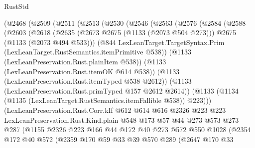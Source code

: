 \begin{lexlean}{RustStd}
\begin{coremodule}
    (@2468
      (@2509
        (@2511
          (@2513
            (@2530
              (@2546
                (@2563
                  (@2576
                    (@2584
                      (@2588
                        (@2603
                          (@2618
                            (@2635
                              (@2673 @2675 (@1133 (@2073 @504 @273)))
                              @2675
                              (@1133 (@2073 @494 @533)))
                            (@844
                              LexLeanTarget.TargetSyntax.Prim
                              (LexLeanTarget.RustSemantics.itemPrimitive @538))
                            (@1133 (LexLeanPreservation.Rust.plainItem @538))
                            (@1133 (LexLeanPreservation.Rust.itemOK @614 @538))
                            (@1133 (LexLeanPreservation.Rust.itemTyped @538 @2612))
                            (@1133 (LexLeanPreservation.Rust.primTyped @157 @2612 @2614))
                            (@1133
                              (@1134 (@1135 (LexLeanTarget.RustSemantics.itemFallible @538)) @223)))
                          (LexLeanPreservation.Rust.Corr.kIf
                            @612
                            @614
                            @616
                            @2326
                            @223
                            @223
                            LexLeanPreservation.Rust.Kind.plain
                            @548
                            @173
                            @57
                            @44
                            @273
                            @573
                            @273
                            @287
                            (@1155
                              @2326
                              @223
                              @166
                              @44
                              @172
                              @40
                              @273
                              @572
                              @550
                              @1028
                              (@2354
                                @172
                                @40
                                @572
                                (@2359
                                  @170
                                  @59
                                  @33
                                  @39
                                  @570
                                  @289
                                  (@2647
                                    @170
                                    @33

\end{coremodule}
\end{lexlean}
